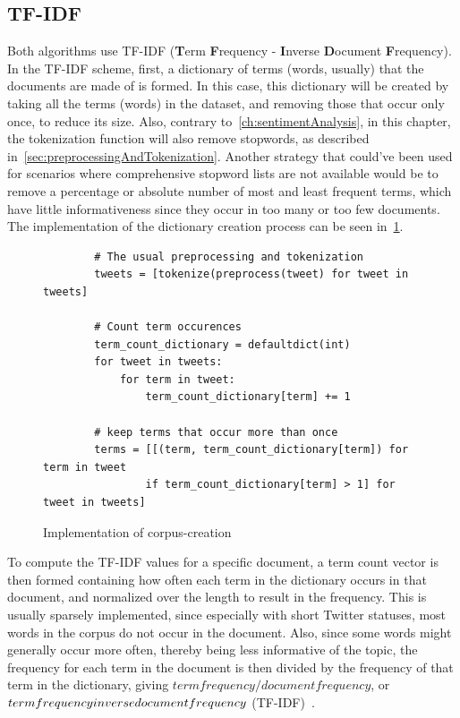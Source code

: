 \subsection{TF-IDF}
\label{subsec:tfidf}

Both algorithms use TF-IDF (\textbf{T}erm \textbf{F}requency - \textbf{I}nverse \textbf{D}ocument \textbf{F}requency).
In the TF-IDF scheme, first, a dictionary of terms (words, usually) that the documents are made of is formed.
In this case, this dictionary will be created by taking all the terms (words) in the dataset,
and removing those that occur only once, to reduce its size.
Also, contrary to~\cref{ch:sentimentAnalysis}, in this chapter,
the tokenization function will also remove stopwords, as described in~\cref{sec:preprocessingAndTokenization}.
Another strategy that could've been used for scenarios where comprehensive stopword lists are not available
would be to remove a percentage or absolute number of most and least frequent terms,
which have little informativeness since they occur in too many or too few documents.
The implementation of the dictionary creation process can be seen in~\cref{code:create_corpus}.

\begin{figure}
    \caption{Implementation of corpus-creation}
    \label{code:create_corpus}
    \begin{verbatim}
        # The usual preprocessing and tokenization
        tweets = [tokenize(preprocess(tweet) for tweet in tweets]

        # Count term occurences
        term_count_dictionary = defaultdict(int)
        for tweet in tweets:
            for term in tweet:
                term_count_dictionary[term] += 1

        # keep terms that occur more than once
        terms = [[(term, term_count_dictionary[term]) for term in tweet
                if term_count_dictionary[term] > 1] for tweet in tweets]
    \end{verbatim}
\end{figure}

To compute the TF-IDF values for a specific document,
a term count vector is then formed containing how often each term in the dictionary occurs in that document,
and normalized over the length to result in the frequency.
This is usually sparsely implemented, since especially with short Twitter statuses,
most words in the corpus do not occur in the document.
Also, since some words might generally occur more often, thereby being less informative of the topic,
the frequency for each term in the document is then divided by the frequency of that term in the dictionary,
giving $term frequency / document frequency$, or $term frequency \* inverse document frequency$ (TF-IDF)~\cite{Blei2003}.

